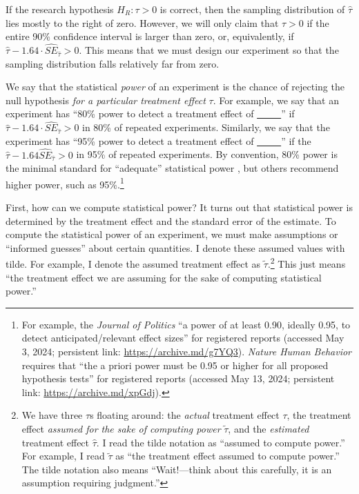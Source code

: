 \documentclass[12pt]{article}
\begin{document}
If the research hypothesis $H_{R}:\tau > 0$ is correct, then the sampling distribution of $\widehat{\tau}$ lies mostly to the right of zero. 
However, we will only claim that $\tau > 0$ if the entire 90\% confidence interval is larger than zero, or, equivalently, if $\widehat{\tau} - 1.64 \cdot {\widehat{SE}}_{\widehat{\tau}} > 0.$
This means that we must design our experiment so that the sampling distribution falls relatively far from zero.

We say that the statistical \emph{power} of an experiment is the chance of rejecting the null hypothesis \emph{for a particular treatment effect} $\tau$. 
For example, we say that an experiment has ``80\% power to detect a treatment effect of \underline{~~~~~}'' if
$\widehat{\tau} - 1.64 \cdot {\widehat{SE}}_{\widehat{\tau}} > 0$ in 80\% of repeated experiments.
Similarly, we say that the experiment has ``95\% power to detect a treatment effect of \underline{~~~~~}'' if the $\widehat{\tau} - 1.64{\widehat{SE}}_{\widehat{\tau}} > 0$ in 95\% of repeated experiments. 
By convention, 80\% power is the minimal standard for ``adequate'' statistical power \citep{Cohen1988}, but others recommend higher power, such as 95\%.\footnote{
  For example, the \textit{Journal of Politics} ``a power of at least 0.90, ideally 0.95, to detect anticipated/relevant effect sizes'' for registered reports (accessed May 3, 2024; persistent link: \url{https://archive.md/g7YQ3}). 
  \textit{Nature Human Behavior} requires that ``the a priori power must be 0.95 or higher for all proposed hypothesis tests'' for registered reports (accessed May 13, 2024; persistent link: \url{https://archive.md/xpGdj}).
  }

First, how can we compute statistical power? 
It turns out that statistical power is determined by the treatment effect and the
standard error of the estimate. 
To compute the statistical power of an experiment, we must make assumptions or ``informed guesses'' about certain quantities. 
I denote these assumed values with tilde. For example, I denote the assumed treatment effect as $\widetilde{\tau}$.\footnote{
  We have three $\tau$s floating around: the \emph{actual} treatment effect $\tau$, the treatment effect \emph{assumed for the sake of computing power} $\widetilde{\tau}$, and the \emph{estimated} treatment effect $\widehat{\tau}$. 
  I read the tilde notation as ``assumed to compute power.'' 
  For example, I read $\widetilde{\tau}$ as ``the treatment effect assumed
  to compute power.'' 
  The tilde notation also means ``Wait!---think about this carefully, it is an assumption requiring judgment.''}
This just means ``the treatment effect we are assuming for the sake of computing statistical power.''
\end{document}
